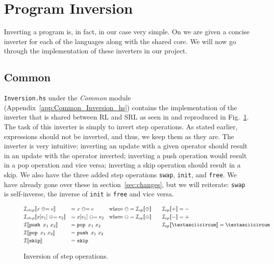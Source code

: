 \section{Program Inversion}

Inverting a program is, in fact, in our case very simple. On \cite[p.~104]{REV} we are given a concise inverter for each of the languages along with the shared core. We will now go through the implementation of these inverters in our project.

\subsection{Common}
\label{sec:invcommon}

\texttt{Inversion.hs} under the \textit{Common} module (Appendix~\ref{app:Common_Inversion_hs}) contains the implementation of the inverter that is shared between RL and SRL as seen in \cite[Fig.~20]{REV} and reproduced in Fig.~\ref{fig:inversion_common}. The task of this inverter is simply to invert step operations. As stated earlier, expressions should not be inverted, and thus, we keep them as they are. The inverter is very intuitive: inverting an update with a given operator should result in an update with the operator inverted; inverting a push operation would result in a pop operation and vice versa; inverting a skip operation should result in a skip. We also have the three added step operations \texttt{swap}, \texttt{init}, and \texttt{free}. We have already gone over these in section~\ref{sec:changes}, but we will reiterate: \texttt{swap} is self-inverse, the inverse of \texttt{init} is \texttt{free} and vice versa.
\begin{figure}
  $$\begin{aligned}
    & \mathcal{I}_{step}\llbracket x \mathrel{\oplus}= e\rrbracket & =\ & x \mathrel{\ominus}= e & & \text{where }\ominus = \mathcal{I}_{op}\llbracket\oplus\rrbracket & \quad & \mathcal{I}_{op}\llbracket +\rrbracket = -\\
    & \mathcal{I}_{step}\llbracket x[e_1] \mathrel{\oplus}= e_2\rrbracket & =\ & x[e_1] \mathrel{\ominus}= e_2 & & \text{where }\ominus = \mathcal{I}_{op}\llbracket\oplus\rrbracket & \quad & \mathcal{I}_{op}\llbracket -\rrbracket = +\\
    & \mathcal{I}\llbracket\texttt{push }x_1\ x_2\rrbracket & =\ & \texttt{pop }x_1\ x_2 & & & \quad & \mathcal{I}_{op}\llbracket \mathrm{\textasciicircum}\rrbracket = \mathrm{\textasciicircum}\\
    & \mathcal{I}\llbracket\texttt{pop }x_1\ x_2\rrbracket & =\ & \texttt{push }x_1\ x_2\\
    & \mathcal{I}\llbracket\texttt{skip}\rrbracket & =\ & \texttt{skip}\\
  \end{aligned}$$
  \caption{Inversion of step operations.}
  \label{fig:inversion_common}
\end{figure}

